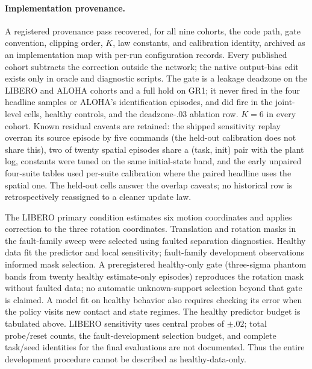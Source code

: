 \paragraph{Implementation provenance.}
A registered provenance pass recovered, for all nine cohorts, the code
path, gate convention, clipping order, $K$, law constants, and calibration
identity, archived as an implementation map with per-run configuration
records. Every published cohort subtracts the correction outside the
network; the native output-bias edit exists only in oracle and diagnostic
scripts. The gate is a leakage deadzone on the LIBERO and ALOHA cohorts and
a full hold on GR1; it never fired in the four headline samples or ALOHA's
identification episodes, and did fire in the joint-level cells, healthy
controls, and the deadzone-$.03$ ablation row. $K=6$ in every cohort. Known
residual caveats are retained: the shipped sensitivity replay overran its
source episode by five commands (the held-out calibration does not share
this), two of twenty spatial episodes share a (task, init) pair with the
plant log, constants were tuned on the same initial-state band, and the
early unpaired four-suite tables used per-suite calibration where the paired
headline uses the spatial one. The held-out cells answer the overlap
caveats; no historical row is retrospectively reassigned to a cleaner
update law.

The LIBERO primary condition estimates six motion coordinates and applies correction
to the three rotation coordinates. Translation and rotation masks in the fault-family
sweep were selected using faulted separation diagnostics. Healthy data fit the predictor
and local sensitivity; fault-family development observations informed mask selection.
A preregistered healthy-only gate (three-sigma phantom bands from twenty
healthy estimate-only episodes) reproduces the rotation mask without faulted
data; no automatic unknown-support selection beyond that gate is claimed. A model fit on healthy behavior also requires checking its error when the
policy visits new contact and state regimes.
The healthy predictor budget is tabulated above. LIBERO sensitivity uses central
probes of $\pm.02$; total probe/reset counts, the fault-development selection budget,
and complete task/seed identities for the final evaluations are not documented.
Thus the entire development procedure cannot be described as healthy-data-only.

